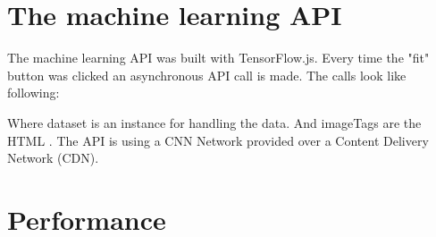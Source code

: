 \section{The machine learning API}
The machine learning API was built with TensorFlow.js. Every time the "fit" button was clicked an asynchronous API call is made. The calls look like following:



Where dataset is an instance for handling the data. And imageTags are the HTML . The API is using a CNN Network provided over a Content Delivery Network (CDN).

\section{Performance}








